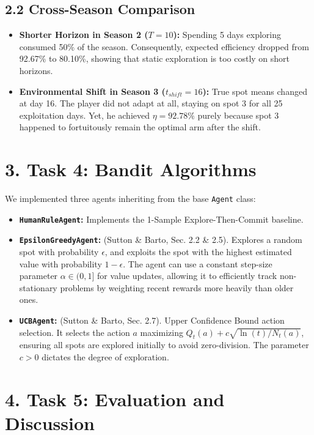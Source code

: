 \documentclass[11pt, a4paper]{article}
\begin{document}
\subsection*{2.2 Cross-Season Comparison}
\begin{itemize}
    \item \textbf{Shorter Horizon in Season 2 ($T=10$):} Spending 5 days exploring consumed 50\% of the season. Consequently, expected efficiency dropped from 92.67\% to 80.10\%, showing that static exploration is too costly on short horizons.
    \item \textbf{Environmental Shift in Season 3 ($t_{shift}=16$):} True spot means changed at day 16. The player did not adapt at all, staying on spot 3 for all 25 exploitation days. Yet, he achieved $\eta=92.78\%$ purely because spot 3 happened to fortuitously remain the optimal arm after the shift.
\end{itemize}

\section*{3. Task 4: Bandit Algorithms}
We implemented three agents inheriting from the base \texttt{Agent} class:
\begin{itemize}
    \item \textbf{\texttt{HumanRuleAgent}:} Implements the 1-Sample Explore-Then-Commit baseline.
    \item \textbf{\texttt{EpsilonGreedyAgent}:} (Sutton \& Barto, Sec. 2.2 \& 2.5). Explores a random spot with probability $\epsilon$, and exploits the spot with the highest estimated value with probability $1 - \epsilon$. The agent can use a constant step-size parameter $\alpha \in (0,1]$ for value updates, allowing it to efficiently track non-stationary problems by weighting recent rewards more heavily than older ones.
    \item \textbf{\texttt{UCBAgent}:} (Sutton \& Barto, Sec. 2.7). Upper Confidence Bound action selection. It selects the action $a$ maximizing $Q_t(a) + c \sqrt{\ln(t) / N_t(a)}$, ensuring all spots are explored initially to avoid zero-division. The parameter $c > 0$ dictates the degree of exploration.
\end{itemize}

\section*{4. Task 5: Evaluation and Discussion}
\end{document}
